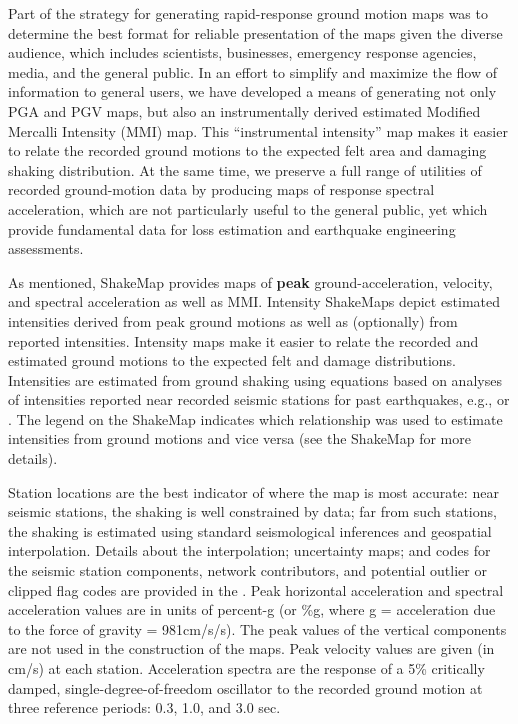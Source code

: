 \documentclass[letterpaper,10pt,english]{sphinxmanual}
\begin{document}
Part of the strategy for generating rapid-response ground motion maps was to
determine the best format for reliable presentation of the maps given the
diverse audience, which includes scientists, businesses, emergency response
agencies, media, and the general public.  In an effort to simplify and maximize
the flow of information to general users, we have developed a means of generating
not only PGA and PGV maps, but also an
instrumentally derived estimated Modified Mercalli Intensity (MMI) map.  This
“instrumental intensity” map makes it easier to relate the recorded
ground motions to the expected felt area and damaging shaking distribution. At the same time,
we preserve a full range of utilities of recorded ground-motion data by
producing maps of response spectral acceleration, which are not particularly
useful to the general public, yet which provide fundamental data for loss
estimation and earthquake engineering assessments.

As mentioned, ShakeMap provides maps of \textbf{peak} ground-acceleration, velocity, and spectral
acceleration as well as MMI. Intensity ShakeMaps
depict estimated intensities derived from peak ground motions as well as
(optionally) from reported intensities. Intensity maps make it easier to relate
the recorded and estimated ground motions to the expected felt and damage
distributions. Intensities are estimated from ground shaking
using equations based on analyses
of intensities reported near recorded seismic stations for past
earthquakes, e.g., {\hyperref[references:wald1999b]{}} or
{\hyperref[references:worden2012]{}}. The
legend on the ShakeMap indicates which relationship was used to estimate
intensities from ground motions and vice versa (see the ShakeMap
{\hyperref[technical_guide:technical\string-guide]{}} for more details).

Station locations are the best indicator of where the map is most accurate: near
seismic stations, the shaking is well constrained by data; far from such
stations, the shaking is estimated using standard seismological inferences and
geospatial interpolation. Details about the interpolation; uncertainty maps; and
codes for the seismic station components, network contributors, and potential
outlier or clipped flag codes are provided in the {\hyperref[technical_guide:technical\string-guide]{}}. Peak
horizontal acceleration and spectral acceleration values are in units of
percent-g (or \%g, where g = acceleration due to the force of gravity = 981cm/s/s). The
peak values of the vertical components are not used in the construction of the
maps. Peak velocity values are given (in cm/s) at each station. Acceleration
spectra are the response of a 5\% critically damped, single-degree-of-freedom
oscillator to the recorded ground motion at three reference periods: 0.3, 1.0,
and 3.0 sec.
\end{document}
